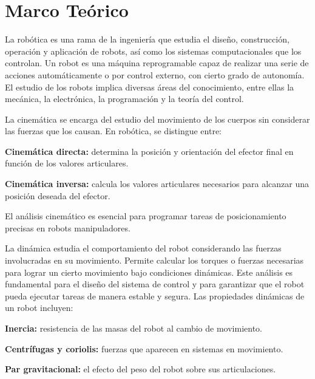 \chapter{Marco Teórico} 
\label{chap:marco_teorico}

La robótica es una rama de la ingeniería que estudia el diseño, construcción, operación y aplicación de robots, así como los sistemas computacionales que los controlan. Un robot es una máquina reprogramable capaz de realizar una serie de acciones automáticamente o por control externo, con cierto grado de autonomía. El estudio de los robots implica diversas áreas del conocimiento, entre ellas la mecánica, la electrónica, la programación y la teoría del control.

La cinemática se encarga del estudio del movimiento de los cuerpos sin considerar las fuerzas que los causan. En robótica, se distingue entre:

\textbf{Cinemática directa:} determina la posición y orientación del efector final en función de los valores articulares.

\textbf{Cinemática inversa:} calcula los valores articulares necesarios para alcanzar una posición deseada del efector.


El análisis cinemático es esencial para programar tareas de posicionamiento precisas en robots manipuladores.

La dinámica estudia el comportamiento del robot considerando las fuerzas involucradas en su movimiento. Permite calcular los torques o fuerzas necesarias para lograr un cierto movimiento bajo condiciones dinámicas. Este análisis es fundamental para el diseño del sistema de control y para garantizar que el robot pueda ejecutar tareas de manera estable y segura.
Las propiedades dinámicas de un robot incluyen:

\textbf{Inercia:} resistencia de las masas del robot al cambio de movimiento.

\textbf{Centrífugas y coriolis:} fuerzas que aparecen en sistemas en movimiento.

\textbf{Par gravitacional:} el efecto del peso del robot sobre sus articulaciones.

\cite{fundamentosRobotica}
\cite{introduccionRobotica}




